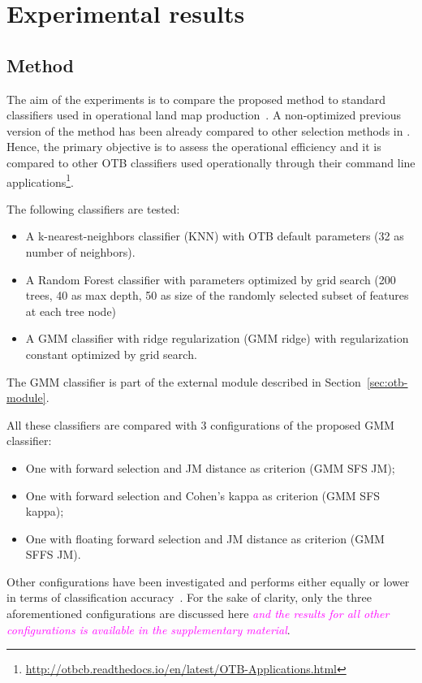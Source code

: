 \documentclass[journal,10pt]{IEEEtran}
\newcommand{\rev}[1]{\textcolor{magenta}{\emph{#1}}}
\begin{document}
\section{Experimental results}
\label{sec:test}

    \subsection{Method}
    \label{sec:method}

    The aim  of the experiments is  to compare the proposed  method to
    standard    classifiers    used    in   operational    land    map
    production~\cite{rs70912356}. A non-optimized  previous version of
    the method has been already compared to other selection methods in
    \cite{fauvel2015fast}.  Hence, the primary  objective is to assess
    the  operational  efficiency  and  it is  compared  to  other  OTB
    classifiers   used  operationally   through  their   command  line
    applications\footnote{\url{http://otbcb.readthedocs.io/en/latest/OTB-Applications.html}}.

    The following classifiers are tested:
    \begin{itemize}
        \item A k-nearest-neighbors classifier (KNN) with OTB default parameters (32 as number of neighbors).
        \item A Random Forest classifier with parameters optimized by grid search (200 trees, 40 as max depth, 50 as size of the randomly selected subset of features at each tree node)
        \item A GMM classifier with ridge regularization (GMM ridge) with regularization constant optimized by grid search.
    \end{itemize}
    The GMM classifier is part of the external module described in Section~\ref{sec:otb-module}.

    All these classifiers are compared with 3 configurations of the proposed GMM classifier:
    \begin{itemize}
    \item One with forward selection and JM distance as criterion (GMM SFS JM);
    \item One with forward selection and Cohen's kappa as criterion (GMM SFS kappa);
    \item One with floating forward selection and JM distance as criterion (GMM SFFS JM).
    \end{itemize}
    Other configurations  have been  investigated and  performs either
    equally     or     lower     in    terms     of     classification
    accuracy~\cite{al:report}. For the sake of clarity, only the three
    aforementioned configurations are discussed here \rev{and the results for all other configurations is available in the supplementary material}.
\end{document}
